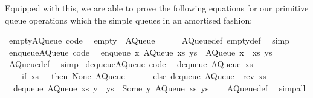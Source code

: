 \begin{isabellebody}
\begin{isamarkuptext}
  Equipped with this, we are able to prove the following equations
  for our primitive queue operations which  the simple
  queues in an amortised fashion:%
\end{isamarkuptext}%
\isamarkuptrue%
%
\isadelimquote
%
\endisadelimquote
%
\isatagquote
{}\isamarkupfalse%
\ empty{\isacharunderscore}AQueue\ {\isacharbrackleft}code{\isacharbrackright}{\isacharcolon}\isanewline
\ \ {\isachardoublequoteopen}empty\ {\isacharequal}\ AQueue\ {\isacharbrackleft}{\isacharbrackright}\ {\isacharbrackleft}{\isacharbrackright}{\isachardoublequoteclose}\isanewline
\ \ \isamarkupfalse%
\ AQueue{\isacharunderscore}def\ empty{\isacharunderscore}def\ \isamarkupfalse%
\ simp\isanewline
\isanewline
{}\isamarkupfalse%
\ enqueue{\isacharunderscore}AQueue\ {\isacharbrackleft}code{\isacharbrackright}{\isacharcolon}\isanewline
\ \ {\isachardoublequoteopen}enqueue\ x\ {\isacharparenleft}AQueue\ xs\ ys{\isacharparenright}\ {\isacharequal}\ AQueue\ {\isacharparenleft}x\ {\isacharhash}\ xs{\isacharparenright}\ ys{\isachardoublequoteclose}\isanewline
\ \ \isamarkupfalse%
\ AQueue{\isacharunderscore}def\ \isamarkupfalse%
\ simp\isanewline
\isanewline
{}\isamarkupfalse%
\ dequeue{\isacharunderscore}AQueue\ {\isacharbrackleft}code{\isacharbrackright}{\isacharcolon}\isanewline
\ \ {\isachardoublequoteopen}dequeue\ {\isacharparenleft}AQueue\ xs\ {\isacharbrackleft}{\isacharbrackright}{\isacharparenright}\ {\isacharequal}\isanewline
\ \ \ \ {\isacharparenleft}if\ xs\ {\isacharequal}\ {\isacharbrackleft}{\isacharbrackright}\ then\ {\isacharparenleft}None{\isacharcomma}\ AQueue\ {\isacharbrackleft}{\isacharbrackright}\ {\isacharbrackleft}{\isacharbrackright}{\isacharparenright}\isanewline
\ \ \ \ else\ dequeue\ {\isacharparenleft}AQueue\ {\isacharbrackleft}{\isacharbrackright}\ {\isacharparenleft}rev\ xs{\isacharparenright}{\isacharparenright}{\isacharparenright}{\isachardoublequoteclose}\isanewline
\ \ {\isachardoublequoteopen}dequeue\ {\isacharparenleft}AQueue\ xs\ {\isacharparenleft}y\ {\isacharhash}\ ys{\isacharparenright}{\isacharparenright}\ {\isacharequal}\ {\isacharparenleft}Some\ y{\isacharcomma}\ AQueue\ xs\ ys{\isacharparenright}{\isachardoublequoteclose}\isanewline
\ \ \isamarkupfalse%
\ AQueue{\isacharunderscore}def\ \isamarkupfalse%
\ simp{\isacharunderscore}all%
\endisatagquote
{\isafoldquote}%
%
\isadelimquote
%
\endisadelimquote
%
\begin{isamarkuptext}%

\end{isamarkuptext}
\end{isabellebody}
